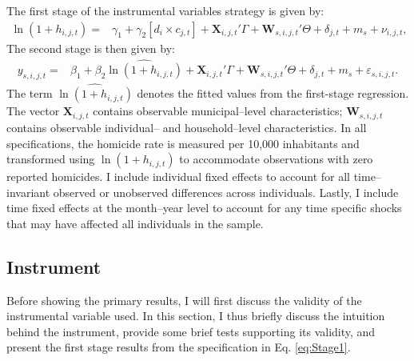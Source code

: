 \documentclass[12pt,letter,english,intoc,bibliography=totoc,index=totoc,BCOR10mm,captions=tableheading,nottitlepage,fleqn]{article}
\theoremstyle{break}
\begin{document}
The first stage of the instrumental variables strategy is given by:
\begin{equation}
\label{eq:Stage1}
\begin{aligned}
\ln \left(1 + h_{i,j,t} \right)
=& \gamma_1
+ \gamma_2 \left[ d_i \times c_{j,t} \right]
+ \mathbf{X}_{i,j,t}' \Gamma
+ \mathbf{W}_{s,i,j,t}' \Theta
+ \delta_{j,t}
+ m_s
+ \nu_{i,j,t},
\end{aligned}
\end{equation}
The second stage is then given by:
\begin{equation}
\label{eq:Stage2}
\begin{aligned}
y_{s,i,j,t}
=& \beta_1
+ \beta_2 \widehat{\ln \left(1 + h_{i,j,t} \right)}
+ \mathbf{X}_{i,j,t}' \Gamma
+ \mathbf{W}_{s,i,j,t}' \Theta
+ \delta_{j,t}
+ m_s
+ \varepsilon_{s,i,j,t}.
\end{aligned}
\end{equation}
 The term $\widehat{\ln \left(1 + h_{i,j,t} \right)}$ denotes the fitted values from the first-stage regression. The vector $\mathbf{X}_{i,j,t}$ contains observable municipal--level characteristics; $\mathbf{W}_{s,i,j,t}$ contains observable individual-- and household--level characteristics. In all specifications, the homicide rate is measured per 10,000 inhabitants and transformed using $\ln(1 + h_{i,j,t})$ to accommodate observations with zero reported homicides. I include individual fixed effects to account for all time--invariant observed or unobserved differences across individuals. Lastly, I include time fixed effects at the month--year level to account for any time specific shocks that may have affected all individuals in the sample.
\subsection{Instrument}
Before showing the primary results, I will first discuss the validity of the instrumental variable used. In this section, I thus briefly discuss the intuition behind the instrument, provide some brief tests supporting its validity, and present the first stage results from the specification in Eq. \eqref{eq:Stage1}. 
\end{document}

